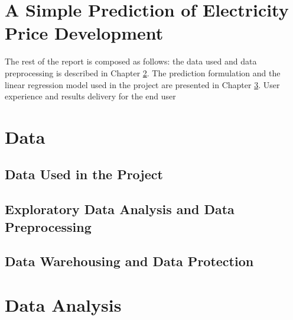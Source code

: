 \documentclass{article}
\begin{document}


\tableofcontents

\section{A Simple Prediction of Electricity Price Development}
\label{section:introduction}


The rest of the report is composed as follows: the data used and data preprocessing is described in Chapter \ref{section:data}. The prediction formulation and the linear regression model used in the project are presented in Chapter \ref{section:analysis}. User experience and results delivery for the end user 

\section{Data}
\label{section:data}

\subsection{Data Used in the Project}
\label{subsection:datadescription}


\subsection{Exploratory Data Analysis and Data Preprocessing}
\label{subsection:eda}


\subsection{Data Warehousing and Data Protection}
\label{subsection:wareousing}


\section{Data Analysis}
\label{section:analysis}
\end{document}
